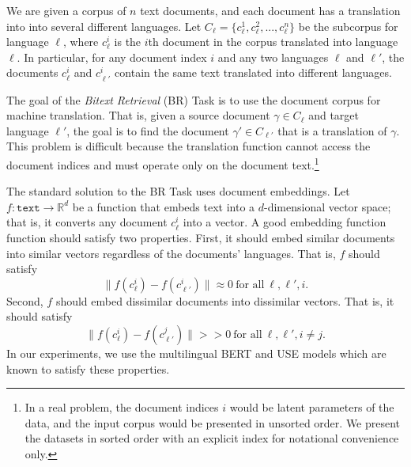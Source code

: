 \documentclass[11pt]{article}
\newcommand{\ltwo}[1]{\lVert{#1}\rVert}
\newcommand{\R}{\mathbb R}
\newcommand{\TEXT}{\texttt{text}}
\newcommand{\defn}[1]{\emph{{#1}}}
\begin{document}
We are given a corpus of $n$ text documents,
and each document has a translation into into several different languages.
Let $C_\ell = \{ c_\ell^1, c_\ell^2, ..., c_\ell^{n} \}$ be the subcorpus for language $\ell$,
where $c_\ell^i$ is the $i$th document in the corpus translated into language $\ell$.
In particular, for any document index $i$ and any two languages $\ell$ and $\ell'$,
the documents $c_{\ell}^i$ and $c_{\ell'}^i$ contain the same text translated into different languages.

The goal of the \defn{Bitext Retrieval} (BR) Task is to use the document corpus for machine translation.
That is, given a source document $\gamma\in C_\ell$ and target language $\ell'$,
the goal is to find the document $\gamma' \in C_{\ell'}$ that is a translation of $\gamma$.
This problem is difficult because the translation function cannot access the document indices and must operate only on the document text.\footnote{%
In a real problem, the document indices $i$ would be latent parameters of the data,
and the input corpus would be presented in unsorted order.
We present the datasets in sorted order with an explicit index for notational convenience only.}

The standard solution to the BR Task uses document embeddings.
Let $f : \TEXT \to \R^d$ be a function that embeds text into a $d$-dimensional vector space;
that is, it converts any document $c_\ell^i$ into a vector. 
A good embedding function function should satisfy two properties.
First, it should embed similar documents into similar vectors regardless of the documents' languages.
That is, $f$ should satisfy
\begin{equation}
    \ltwo{f(c_{\ell}^i) - f(c_{\ell'}^i)} \approx 0 ~\text{for all}~ \ell,\ell',i
    .
\end{equation}
Second, $f$ should embed dissimilar documents into dissimilar vectors.
That is, it should satisfy
\begin{equation}
    \ltwo{f(c_{\ell}^i) - f(c_{\ell'}^j)} >\!\!> 0 ~\text{for all}~ \ell,\ell',i\ne j
    .
\end{equation}
In our experiments, we use the multilingual BERT \cite{} and USE \cite{} models which are known to satisfy these properties.
\end{document}
